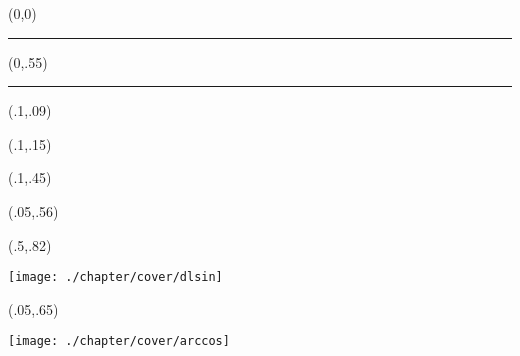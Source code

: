 \pagestyle{empty}

\begin{textblock}{1}(0,0)
    \noindent\textcolor{plop}{\rule{\paperwidth}{.55\paperheight}}
\end{textblock}


\begin{textblock}{1}(0,.55)
    \noindent\textcolor{black}{\rule{\paperwidth}{.45\paperheight}}
\end{textblock}


\begin{textblock}{1}(.1,.09)
    \noindent{\fontsize{24.88}{2}\selectfont
        \bfseries\textcolor{white}{学习笔记}}
\end{textblock}

\begin{textblock}{1}(.1,.15)
    \noindent {\fontsize{24.88}{2}\selectfont
    \bfseries\textcolor{white}{深度学习：从MLP到GNN}}
\end{textblock}


\begin{textblock}{1}(.1,.45)
    \noindent {\fontsize{20.74}{2}\selectfont
        \bfseries\textcolor{white}{李开运}}
\end{textblock}



\begin{textblock}{.9}(.05,.56)
    \begin{flushright}
        \noindent {\fontsize{20.74}{2}\selectfont
            \bfseries\textcolor{orange}{version 1.1}}
    \end{flushright}
\end{textblock}


\begin{textblock}{.45}(.5,.82)
    \begin{center}
        \texttt{[image: ./chapter/cover/dlsin]}
    \end{center}
\end{textblock}

\begin{textblock}{.4}(.05,.65)
    \begin{center}
        \texttt{[image: ./chapter/cover/arccos]}
    \end{center}
\end{textblock}


